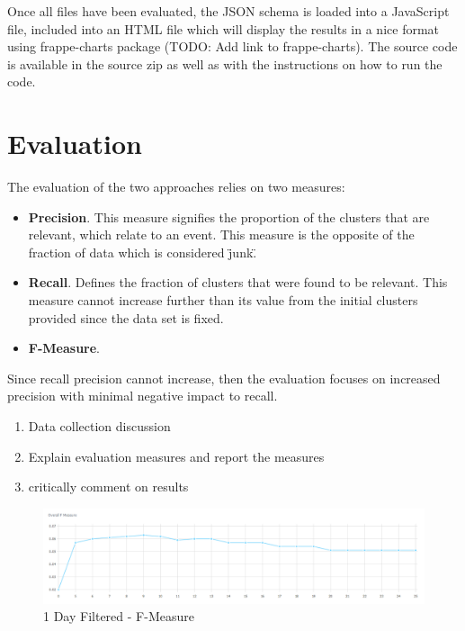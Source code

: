 \documentclass[a4paper,portrait,12pt]{article}
\begin{document}
Once all files have been evaluated, the JSON schema is loaded into a JavaScript file, included into an HTML file which will display the results in a nice format using frappe-charts package (TODO: Add link to frappe-charts).
The source code is available in the source zip as well as with the instructions on how to run the code.


\section{Evaluation}
\label{section-eval}

The evaluation of the two approaches relies on two measures:
\begin{itemize}
	\item \textbf{Precision}. This measure signifies the proportion of the clusters that are relevant, which relate to an event.
	      This measure is the opposite of the fraction of data which is considered \"junk\".
	\item \textbf{Recall}. Defines the fraction of clusters that were found to be relevant.
	      This measure cannot increase further than its value from the initial clusters provided since the data set is fixed.
	\item \textbf{F-Measure}.
\end{itemize}

Since recall precision cannot increase, then the evaluation focuses on increased precision with minimal negative impact to recall.

\begin{enumerate}
	\item Data collection discussion
	\item Explain evaluation measures and report the measures
	\item critically comment on results
\end{enumerate}

\begin{figure}[h!]
	\centering
	\includegraphics[width=\linewidth]{images/1day-filtered-f-measure.png}
	\caption{1 Day Filtered - F-Measure}
	\label{fig:1day-filtered-f-measure}
\end{figure}
\end{document}
